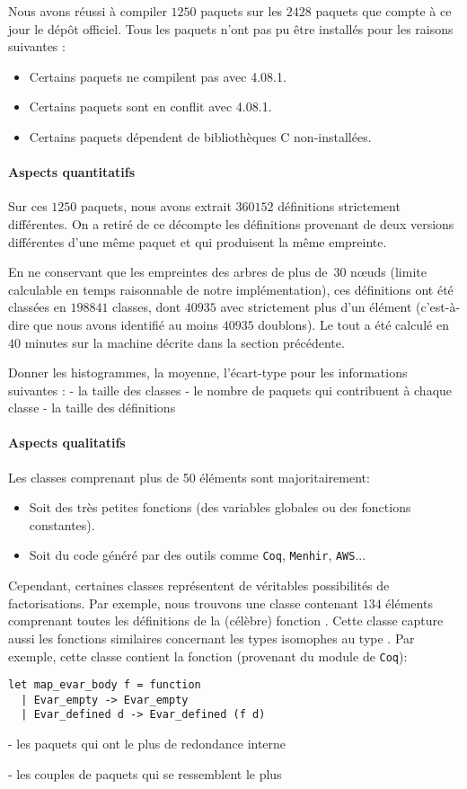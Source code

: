 Nous avons réussi à compiler $1250$ paquets sur les $2428$ paquets que
compte à ce jour le dépôt {\Opam} officiel. Tous les paquets n'ont pas
pu être installés pour les raisons suivantes :

\begin{itemize}
\item Certains paquets ne compilent pas avec {\OCaml} 4.08.1.
\item Certains paquets sont en conflit avec {\OCaml} 4.08.1.
\item Certains paquets dépendent de bibliothèques C non-installées.
\end{itemize}

\paragraph{Aspects quantitatifs}

Sur ces $1250$ paquets, nous avons extrait $360152$ définitions
strictement différentes. On a retiré de ce décompte les définitions
provenant de deux versions différentes d'une même paquet et qui
produisent la même empreinte.

En ne conservant que les empreintes des arbres de plus de~$30$ nœuds
(limite calculable en temps raisonnable de notre implémentation), ces
définitions ont été classées en $198841$ classes, dont $40935$ avec
strictement plus d'un élément (c'est-à-dire que nous avons identifié
au moins $40935$ doublons). Le tout a été calculé en $40$ minutes sur
la machine décrite dans la section précédente.

Donner les histogrammes, la moyenne, l'écart-type pour les
informations suivantes :
- la taille des classes
- le nombre de paquets qui contribuent à chaque classe
- la taille des définitions

\paragraph{Aspects qualitatifs}

Les classes comprenant plus de 50 éléments sont majoritairement:
\begin{itemize}
\item Soit des très petites fonctions (des variables globales ou des fonctions constantes).
\item Soit du code généré par des outils comme \verb|Coq|, \verb|Menhir|, \verb|AWS|...
\end{itemize}

Cependant, certaines classes représentent de véritables possibilités de factorisations. Par exemple, nous trouvons une classe contenant $134$ éléments comprenant toutes les définitions de la (célèbre) fonction . Cette classe capture aussi les fonctions similaires concernant les types isomophes au type . Par exemple, cette classe contient la fonction (provenant du module  de \verb|Coq|):

\begin{verbatim}
let map_evar_body f = function
  | Evar_empty -> Evar_empty
  | Evar_defined d -> Evar_defined (f d)
\end{verbatim}

- les paquets qui ont le plus de redondance interne

- les couples de paquets qui se ressemblent le plus
